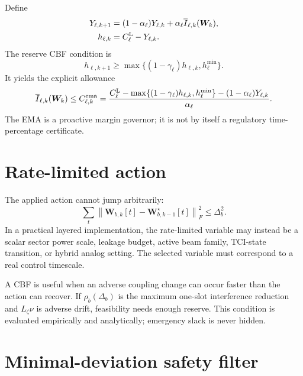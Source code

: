 \documentclass[11pt]{article}
\newcommand{\W}{\bm W}
\newcommand{\norm}[1]{\left\lVert #1\right\rVert}
\begin{document}
Define
\begin{align}
 Y_{\ell,k+1}&=(1-\alpha_\ell)Y_{\ell,k}+\alpha_\ell\overline I_{\ell,k}(\W_k),\\
 h_{\ell,k}&=C_\ell^{\rm L}-Y_{\ell,k}.
\end{align}
The reserve CBF condition is
\begin{equation}
 h_{\ell,k+1}\ge \max\{(1-\gamma_\ell)h_{\ell,k},h_\ell^{\min}\}.
 \label{eq:cbf}
\end{equation}
It yields the explicit allowance
\begin{equation}
 \overline I_{\ell,k}(\W_k)\le
 C_{\ell,k}^{\rm ema}
 =\frac{C_\ell^{\rm L}-\max\{(1-\gamma_\ell)h_{\ell,k},h_\ell^{\min}\}-(1-\alpha_\ell)Y_{\ell,k}}{\alpha_\ell}.
 \label{eq:allowance}
\end{equation}
The EMA is a proactive margin governor; it is not by itself a regulatory time-percentage certificate.

\section{Rate-limited action}

The applied action cannot jump arbitrarily:
\begin{equation}
 \sum_t\norm{\W_{b,k}[t]-\W_{b,k-1}^{\star}[t]}_F^2\le\Delta_b^2.
 \label{eq:slew}
\end{equation}
In a practical layered implementation, the rate-limited variable may instead be a scalar sector power scale, leakage budget, active beam family, TCI-state transition, or hybrid analog setting. The selected variable must correspond to a real control timescale.

A CBF is useful when an adverse coupling change can occur faster than the action can recover. If $\rho_b(\Delta_b)$ is the maximum one-slot interference reduction and $L_\zeta\nu$ is adverse drift, feasibility needs enough reserve. This condition is evaluated empirically and analytically; emergency slack is never hidden.

\section{Minimal-deviation safety filter}
\end{document}
